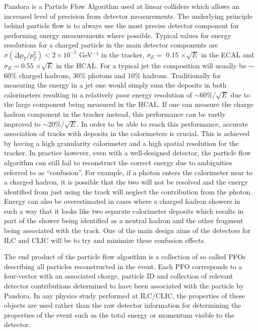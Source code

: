 Pandora\cite{Thomson200925} is a Particle Flow Algorithm used at linear colliders which allows an increased level of precision from detector measurements. The underlying principle behind particle flow is to always use the most precise detector component for performing energy measurements where possible. Typical values for energy resolutions for a charged particle in the main detector components are $\sigma(\Delta p_T/ p_{T}^2) < 2 \times 10^{-5}$ GeV$^{-1}$ in the tracker, $\sigma_E =$ 0.15 $\times \sqrt{E}$ in the \ac{ECAL} and $\sigma_E =$0.55 $\times \sqrt{E}$ in the \ac{HCAL}. For a typical jet the composition will usually be $\sim$60\% charged hadrons, 30\% photons and 10\% hadrons. Traditionally for measuring the energy in a jet one would simply sum the deposits in both calorimeters resulting in a relatively poor energy resolution of $\sim$60\%/$\sqrt{E}$ due to the large component being measured in the \ac{HCAL}. If one can measure the charge hadron component in the tracker instead, this performance can be vastly improved to $\sim$20\%/$\sqrt{E}$. In order to be able to reach this performance, accurate association of tracks with deposits in the calorimeters is crucial. This is achieved by having a high granularity calorimeter and a high spatial resolution for the tracker. In practice however, even with a well-designed detector, the particle flow algorithm can still fail to reconstruct the correct energy due to ambiguities referred to as ``confusion''. For example, if a photon enters the calorimeter near to a charged hadron, it is possible that the two will not be resolved and the energy identified from just using the track will neglect the contribution from the photon. Energy can also be overestimated in cases where a charged hadron showers in such a way that it looks like two separate calorimeter deposits which results in part of the shower being identified as a neutral hadron and the other fragment being associated with the track. One of the main design aims of the detectors for \ac{ILC} and \ac{CLIC} will be to try and minimize these confusion effects.

The end product of the particle flow algorithm is a collection of so called \ac{PFO}s describing all particles reconstructed in the event. Each \ac{PFO} corresponds to a four-vector with an associated charge, particle ID and collection of relevant detector contributions determined to have been associated with the particle by Pandora. In any physics study performed at \ac{ILC}/\ac{CLIC}, the properties of these objects are used rather than the raw detector information for determining the properties of the event such as the total energy or momentum visible to the detector.


